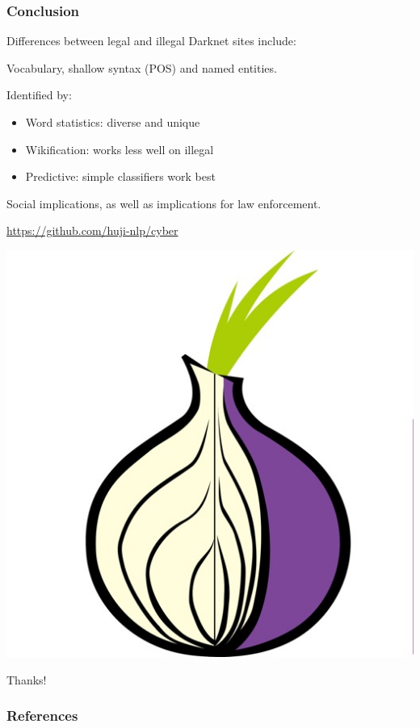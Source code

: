 \documentclass[t,xcolor={svgnames,table}]{beamer}
\begin{document}
\begin{frame}
	\frametitle{Conclusion}
	Differences between legal and illegal Darknet sites include:
	
	Vocabulary,
	shallow syntax (POS)
	and named entities.
	\vfill
	\pause
	
	Identified by:
	\begin{itemize}\setlength\itemsep{1em}
	\item Word statistics: diverse and unique
	\item Wikification: works less well on illegal
	\item Predictive: simple classifiers work best
	\end{itemize}
	\vfill
	\pause
	
	Social implications, as well as implications for law enforcement.
	\vfill
	\pause
	
	\begin{minipage}{.7\textwidth}
	\color{blue}\url{https://github.com/huji-nlp/cyber}
	\end{minipage}
	\pause
	\begin{minipage}{.28\textwidth}
	\centering\vspace{-2cm}
	\includegraphics[width=.8\textwidth]{onion.jpg}
	
	Thanks!
	\end{minipage}
\end{frame}

\begin{frame}[allowframebreaks]
\frametitle{References}

\tiny
\end{frame}
\end{document}
